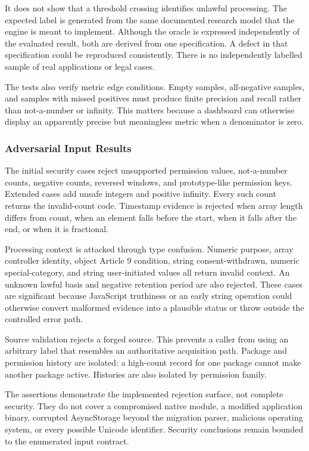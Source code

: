It does not show that a threshold crossing identifies unlawful processing. The expected label is generated from the same documented research model that the engine is meant to implement. Although the oracle is expressed independently of the evaluated result, both are derived from one specification. A defect in that specification could be reproduced consistently. There is no independently labelled sample of real applications or legal cases.

The tests also verify metric edge conditions. Empty samples, all-negative samples, and samples with missed positives must produce finite precision and recall rather than not-a-number or infinity. This matters because a dashboard can otherwise display an apparently precise but meaningless metric when a denominator is zero.

\subsubsection{Adversarial Input Results}

The initial security cases reject unsupported permission values, not-a-number counts, negative counts, reversed windows, and prototype-like permission keys. Extended cases add unsafe integers and positive infinity. Every such count returns the invalid-count code. Timestamp evidence is rejected when array length differs from count, when an element falls before the start, when it falls after the end, or when it is fractional.

Processing context is attacked through type confusion. Numeric purpose, array controller identity, object Article 9 condition, string consent-withdrawn, numeric special-category, and string user-initiated values all return invalid context. An unknown lawful basis and negative retention period are also rejected. These cases are significant because JavaScript truthiness or an early string operation could otherwise convert malformed evidence into a plausible status or throw outside the controlled error path.

Source validation rejects a forged source. This prevents a caller from using an arbitrary label that resembles an authoritative acquisition path. Package and permission history are isolated: a high-count record for one package cannot make another package active. Histories are also isolated by permission family.

The assertions demonstrate the implemented rejection surface, not complete security. They do not cover a compromised native module, a modified application binary, corrupted AsyncStorage beyond the migration parser, malicious operating system, or every possible Unicode identifier. Security conclusions remain bounded to the enumerated input contract.

